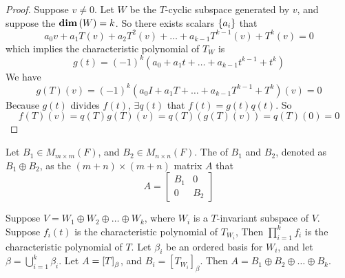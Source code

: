 \begin{proof}
    Suppose $v \neq 0$. Let $W$ be the $T$-cyclic subspace generated by $v$, and suppose the $\displaystyle \mathbf{dim}\left( W \right) =k$. So there exists scalars $\set{a_i}$ that 
    \begin{equation*}
        a_0 v + a_1 T(v) + a_2 T^2(v) + \dots + a_{k-1} T^{k-1}(v) + T^k(v) = 0
    \end{equation*}
    which implies the characteristic polynomial of $T_W$ is
    \begin{equation*}
        g(t) = (-1)^k \left(a_0 + a_1 t + \dots + a_{k-1} t^{k-1} + t^k \right)
    \end{equation*}
    We have
    \begin{equation*}
        g(T)(v) = (-1)^k \left(a_0 I + a_1 T + \dots + a_{k-1} T^{k-1} + T^k \right)(v) = 0
    \end{equation*}
    Because $g(t)$ divides $f(t)$, $\exists q(t)$ that $f(t) = g(t) q(t)$. So
    \begin{equation*}
        f(T)(v) = q(T)g(T)(v) = q(T) \left(g(T)(v)\right) = q(T)(0) = 0
    \end{equation*}
\end{proof}



\begin{definition}
    Let $B_1 \in M_{m \times m}(F)$, and $B_2 \in M_{n \times n} (F)$. The  of $B_1$ and $B_2$, denoted as $B_1 \oplus B_2$, as the $(m+n) \times (m+n)$ matrix $A$ that
    \begin{equation*}
        A = \begin{bmatrix}
            B_1 & 0 \\
            0 & B_2
        \end{bmatrix}
    \end{equation*}
\end{definition}


\begin{theorem}
    Suppose $V=W_1 \oplus W_2 \oplus \dots \oplus W_k$, where $W_i$ is a $T$-invariant subspace of $V$. Suppose $f_i(t)$ is the characteristic polynomial of $T_{W_i}$, Then $\displaystyle \prod_{i=1}^k f_i$ is the characteristic polynomial of $T$. Let $\beta_i$ be an ordered basis for $W_i$, and let $\displaystyle \beta = \bigcup_{i=1}^k \beta_i$. Let $A=\coordinate{T}_\beta$, and $B_i=[T_{W_i}]_\beta$. Then $A = B_1 \oplus B_2 \oplus \dots \oplus B_k$.
\end{theorem}




